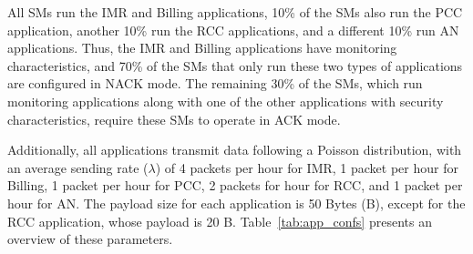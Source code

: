 \documentclass[a4paper,fleqn]{cas-dc}
\begin{document}
%
All \gls{SMs} run the IMR and Billing applications, 10\% of the \gls{SMs} also run the PCC application, another 10\% run the RCC applications, and a different 10\% run AN applications. Thus, the IMR and Billing applications have monitoring characteristics, and 70\% of the \gls{SMs} that only run these two types of applications are configured in \gls{NACK} mode. The remaining 30\% of the \gls{SMs}, which run monitoring applications along with one of the other applications with security characteristics, require these \gls{SMs} to operate in \gls{ACK} mode.

Additionally, all applications transmit data following a Poisson distribution, with an average sending rate (\( \lambda \)) of 4 packets per hour for IMR, 1 packet per hour for Billing, 1 packet per hour for PCC, 2 packets for hour for RCC, and 1 packet per hour for AN. The payload size for each application is 50 Bytes (B), except for the RCC application, whose payload is 20 B. Table~\ref{tab:app_confs} presents an overview of these parameters.
\end{document}
